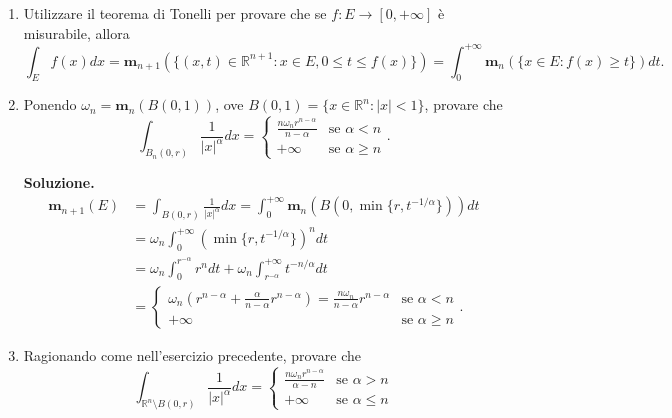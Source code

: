 \begin{enumerate}
	
	\item Utilizzare il teorema di Tonelli per provare che se $f: E \to [0, +\infty]$ è misurabile, allora
	\[
	\int_E f(x) dx = \mathbf{m}_{n+1} \left(\{(x,t) \in \mathbb{R}^{n+1} : x \in E, 0 \leq t \leq f(x)\}\right) = \int_0^{+\infty} \mathbf{m}_n \left(\{x \in E : f(x) \geq t\}\right) dt.
	\]
	
	\item Ponendo $\omega_n = \mathbf{m}_n(B(0,1))$, ove $B(0,1) = \{x \in \mathbb{R}^n : |x| < 1\}$, provare che
	\[
	\int_{B_n(0,r)} \frac{1}{|x|^\alpha} dx =
	\begin{cases}
		\frac{n \omega_n r^{n - \alpha}}{n - \alpha} & \text{se } \alpha < n \\
		+\infty & \text{se } \alpha \geq n
	\end{cases}.
	\]
	
	\textbf{Soluzione.}
		\[
		\begin{aligned}
			\mathbf{m}_{n+1}(E) &= \int_{B(0,r)} \frac{1}{|x|^\alpha} dx = \int_0^{+\infty} \mathbf{m}_n \left(B\left(0, \min\{r, t^{-1/\alpha}\}\right)\right) dt \\
			&= \omega_n \int_0^{+\infty} \left(\min\{r, t^{-1/\alpha}\}\right)^n dt \\
			&= \omega_n \int_0^{r^{-\alpha}} r^n dt + \omega_n \int_{r^{-\alpha}}^{+\infty} t^{-n/\alpha} dt \\
			&=
			\begin{cases}
				\omega_n \left(r^{n - \alpha} + \frac{\alpha}{n - \alpha} r^{n - \alpha}\right) = \frac{n \omega_n}{n - \alpha} r^{n - \alpha} & \text{se } \alpha < n \\
				+\infty & \text{se } \alpha \geq n
			\end{cases}.
		\end{aligned}
		\]
	
	
	\item Ragionando come nell'esercizio precedente, provare che
	\[
	\int_{\mathbb{R}^n \setminus B(0,r)} \frac{1}{|x|^\alpha} dx =
	\begin{cases}
		\frac{n \omega_n r^{n - \alpha}}{\alpha - n} & \text{se } \alpha > n \\
		+\infty & \text{se } \alpha \leq n
	\end{cases}
	\]
	

\end{enumerate}
